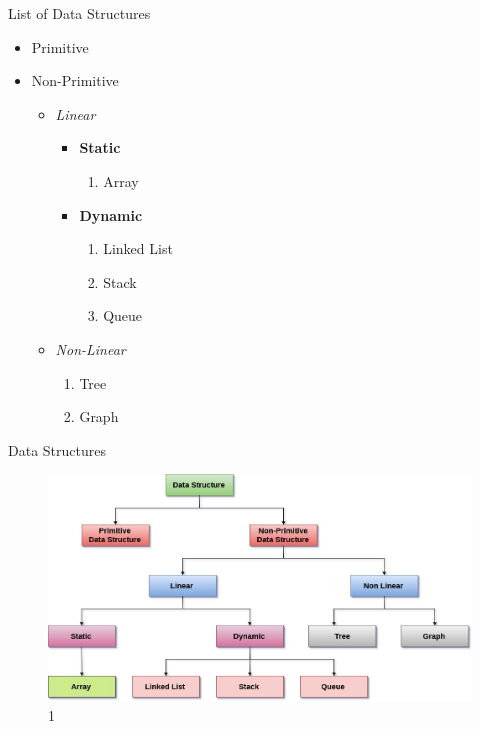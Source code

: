 \documentclass{beamer}       %
\begin{document}
\begin{frame}{List of Data Structures}
\begin{itemize}                %
    \item<1-> Primitive
    \item<2-> Non-Primitive
    \begin{itemize}                %
        \item<3-> \textit{Linear}
        \begin{itemize}                %
            \item<4-> \textbf{Static}
            \begin{enumerate}             %
                \item<5-> Array
            \end{enumerate}
            \item<4-> \textbf{Dynamic}
            \begin{enumerate}             %
                \item<5-> Linked List
                \item<5-> Stack
                \item<5-> Queue
            \end{enumerate}
        \end{itemize}
        \item<6-> \textit{Non-Linear}
        \begin{enumerate}             %
            \item<6-> Tree
            \item<6-> Graph
        \end{enumerate}
    \end{itemize}
\end{itemize}
\end{frame}

\begin{frame}{Data Structures}
\begin{figure}              %
    \centering
    \includegraphics[scale=0.25]{Image 1.jpeg}
    \caption{1}
    \label{fig:fig_1}
\end{figure}
\end{frame}
\end{document}
